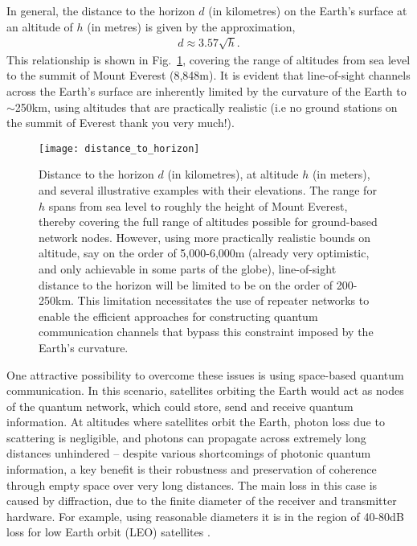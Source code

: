 In general, the distance to the horizon $d$ (in kilometres) on the Earth's surface at an altitude of $h$ (in metres) is given by the approximation,
\begin{align}
d \approx 3.57\sqrt{h}.
\end{align}
This relationship is shown in Fig.~\ref{fig:dist_hor}, covering the range of altitudes from sea level to the summit of Mount Everest (8,848m). It is evident that line-of-sight channels across the Earth's surface are inherently limited by the curvature of the Earth to $\sim$250km, using altitudes that are practically realistic (i.e no ground stations on the summit of Everest thank you very much!).

\begin{figure}[!htbp]
\texttt{[image: distance\_to\_horizon]}
\captionspacefig \caption{Distance to the horizon $d$ (in kilometres), at altitude $h$ (in meters), and several illustrative examples with their elevations. The range for $h$ spans from sea level to roughly the height of Mount Everest, thereby covering the full range of altitudes possible for ground-based network nodes. However, using more practically realistic bounds on altitude, say on the order of 5,000-6,000m (already very optimistic, and only achievable in some parts of the globe), line-of-sight distance to the horizon will be limited to be on the order of 200-250km. This limitation necessitates the use of repeater networks to enable the efficient approaches for constructing quantum communication channels that bypass this constraint imposed by the Earth's curvature.} \label{fig:dist_hor}
\end{figure}

One attractive possibility to overcome these issues is using space-based quantum communication. In this scenario, satellites orbiting the Earth would act as nodes of the quantum network, which could store, send and receive quantum information. At altitudes where satellites orbit the Earth, photon loss due to scattering is negligible, and photons can propagate across extremely long distances unhindered -- despite various shortcomings of photonic quantum information, a key benefit is their robustness and preservation of coherence through empty space over very long distances. The main loss in this case is caused by diffraction, due to the finite diameter of the receiver and transmitter hardware. For example, using reasonable diameters it is in the region of 40-80dB loss for low Earth orbit (LEO) satellites \cite{bib:aspelmeyer2003long, bib:liao2016ground}.

